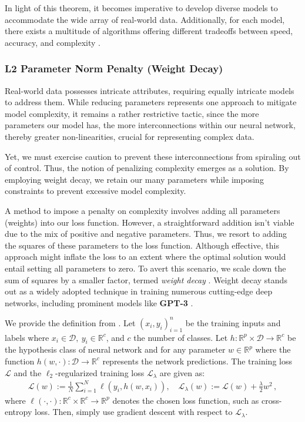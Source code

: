 \documentclass{article}
\begin{document}
In light of this theorem, it becomes imperative to develop diverse models to accommodate the wide array of real-world data. Additionally, for each model, there exists a multitude of algorithms offering different tradeoffs between speed, accuracy, and complexity \citep{MurphyML}.

\subsubsection{L2 Parameter Norm Penalty (Weight Decay)}    \label{sub:L1 and L2 Regularization}
Real-world data possesses intricate attributes, requiring equally intricate models to address them. While reducing parameters represents one approach to mitigate model complexity, it remains a rather restrictive tactic, since the more parameters our model has, the more interconnections within our neural network, thereby greater non-linearities, crucial for representing complex data.

Yet, we must exercise caution to prevent these interconnections from spiraling out of control. Thus, the notion of penalizing complexity emerges as a solution. By employing weight decay, we retain our many parameters while imposing constraints to prevent excessive model complexity.

A method to impose a penalty on complexity involves adding all parameters (weights) into our loss function. However, a straightforward addition isn't viable due to the mix of positive and negative parameters. Thus, we resort to adding the squares of these parameters to the loss function. Although effective, this approach might inflate the loss to an extent where the optimal solution would entail setting all parameters to zero. To avert this scenario, we scale down the sum of squares by a smaller factor, termed \textit{weight decay} \citep{Vasani_2019}. Weight decay stands out as a widely adopted technique in training numerous cutting-edge deep networks, including prominent models like \textbf{GPT-3} \citep{andriushchenko2023need}.

We provide the definition from \cite{andriushchenko2023need}. Let $(x_i,y_i)_{i = 1}^{n}$ be the training inputs and labels where $x_i \in \mathcal{D},~y_i \in \mathbb{R}^{c}$, and $c$ the number of classes. Let $h: \mathbb{R}^{p} \times \mathcal{D} \to \mathbb{R}^{c}$ be the hypothesis class of neural network and for any parameter $w \in \mathbb{R}^{p}$ where the function $h(w, \cdot): \mathcal{D} \to \mathbb{R}^{c}$ represents the network predictions. The training loss $\mathcal{L}$ and the $\ell_2$-regularized training loss $\mathcal{L}_{\lambda}$ are given as: 
\begin{align}
\label{eq:general_loss}
    \mathcal{L}(w):= \frac{1}{N} \sum_{i=1}^{N} \ell \left(y_i, h({w}, x_i)\right), \quad \mathcal{L}_{\lambda}(w) := \mathcal{L}(w) + \frac{\lambda}{2} {w}^2 \, ,
\end{align}
where $\ell(\cdot,\cdot):\mathbb{R}^c \times \mathbb{R}^c \to \mathbb{R}^p$ denotes the chosen loss function, such as cross-entropy loss. Then, simply use gradient descent with respect to $\mathcal{L}_{\lambda}.$
\end{document}
